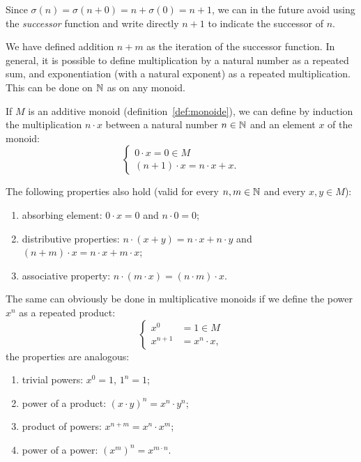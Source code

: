 %
Since $\sigma(n) = \sigma(n+0) = n+\sigma(0) = n+1$, 
we can in the future avoid using the \emph{successor} function 
and write directly $n+1$ to indicate the successor of $n$.

We have defined addition $n+m$ 
as the iteration of the successor function.
In general, it is possible to define multiplication by a natural number 
as a repeated sum, and exponentiation (with a natural exponent)
as a repeated multiplication.
This can be done on ${\mathbb N}$ as on any monoid.

\begin{theorem}
\label{th:operazioni_iterate}%
\label{th:operazione_ripetuta}%
If $M$ is an additive monoid (definition~\ref{def:monoide}),
we can define by induction the multiplication $n\cdot x$ between a natural 
number $n\in {\mathbb N}$ and an element $x$ of the monoid:
\[
\begin{cases}
  0\cdot x = 0 \in M \\
  (n+1)\cdot x = n\cdot x + x.
\end{cases}
\]

The following properties also hold
(valid for every $n,m\in {\mathbb N}$ and every $x,y\in M$):
\begin{enumerate}
  \item absorbing element: $0\cdot x = 0$ and $n\cdot 0 = 0$;
  \item distributive properties: 
    $n\cdot (x+y)=n\cdot x + n\cdot y$
    and $(n+m)\cdot x = n\cdot x + m\cdot x$;
  \item associative property: $n\cdot (m\cdot x)= (n\cdot m)\cdot x$.
\end{enumerate}

The same can obviously be done in multiplicative monoids
if we define the power $x^n$ as a repeated product:
\[
\begin{cases}
  x^0 &= 1 \in M \\
  x^{n+1} &= x^n \cdot x,
\end{cases}
\]
the properties are analogous:
\begin{enumerate}
  \item trivial powers: $x^0=1$, $1^n=1$;
  \item power of a product: $(x\cdot y)^n = x^n\cdot y^n$;
  \item product of powers: $x^{n+m}=x^n\cdot x^m$;
  \item power of a power: $(x^m)^n = x^{m\cdot n}$.
\end{enumerate}
\end{theorem}
